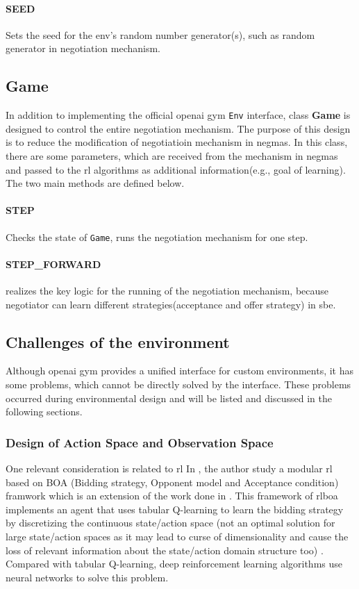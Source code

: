 \paragraph{SEED} Sets the seed for the env's random number generator(s), such as random generator in negotiation mechanism.

\subsection{Game} \label{game}
In addition to implementing the official \gls{openai gym} \texttt{Env} interface, class \textbf{Game} is designed to control the entire negotiation mechanism. The purpose of this design is to reduce the modification of negotiatioin mechanism in \gls{negmas}. In this class, there are some parameters, which are received from the mechanism in \gls{negmas} and passed to the \gls{rl} algorithms as additional information(e.g., goal of learning). The two main methods are defined below.
 
\paragraph{STEP} Checks the state of \texttt{Game}, runs the negotiation mechanism for one step.
\paragraph{STEP\_FORWARD} realizes the key logic for the running of the negotiation mechanism, because negotiator can learn different strategies(acceptance and offer strategy) in \gls{sbe}. 

\subsection{Challenges of the environment}
Although \gls{openai gym} provides a unified interface for custom environments, it has some problems, which cannot be directly solved by the interface. These problems occurred during environmental design and will be listed and discussed in the following sections. 

\subsubsection{Design of Action Space and Observation Space}
One relevant consideration is related to \gls{rl} In \parencite{Bakker2019RLBOAAM}, the author study a modular \gls{rl} based on BOA (Bidding strategy, Opponent model and Acceptance condition) framwork which is an extension of the work done in \parencite{Bakker2019RLBOAAM}. This framework of \gls{rlboa} implements an agent that uses tabular Q-learning to learn the bidding strategy by discretizing the continuous state/action space (not an optimal solution for large state/action spaces as it may lead to curse of dimensionality and cause the loss of relevant information about the state/action domain structure too) \parencite{bagga2020deep}. 
Compared with tabular Q-learning, deep reinforcement learning algorithms use neural networks to solve this problem.
 
